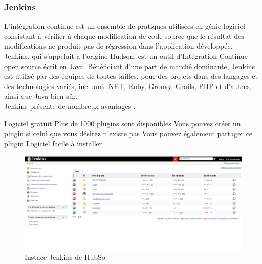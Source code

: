 \subsubsection{Jenkins}
L'intégration continue est un ensemble de pratiques utilisées en génie logiciel consistant à vérifier à chaque modification de code source que le résultat des modifications ne produit pas de régression dans l'application développée.\\
Jenkins, qui s'appelait à l'origine Hudson, est un outil d'Intégration Continue open source écrit en Java. Bénéficiant d'une part de marché dominante, Jenkins est utilisé par des équipes de toutes tailles, pour des projets dans des langages et des technologies variés, incluant .NET, Ruby, Groovy, Grails, PHP et d'autres, ainsi que Java bien sûr.\\
Jenkins présente de nombreux avantages :
\begin{itemize}
	\itemcheck Logiciel gratuit
	\itemcheck Plus de 1000 plugins sont disponibles
	\itemcheck Vous pouvez créer un plugin si celui que vous désirez n'existe pas
	\itemcheck Vous pouvez également partager ce plugin
	\itemcheck Logiciel facile à installer
\end{itemize}
\begin{figure}[H]
	\centering
	\begin{minipage}{12cm}
		\centering
		\includegraphics[width=1\textwidth]{fig/jenkins.png}
	\end{minipage}
	\caption{Instace Jenkins de HubSo}
	\label{fig:vadf}
\end{figure}
